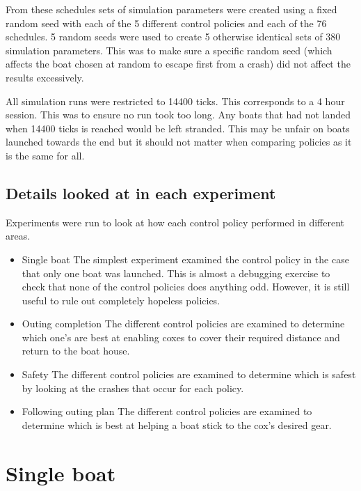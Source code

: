   From these schedules sets of simulation parameters were created
  using a fixed random seed with each of the 5 different control
  policies and each of the 76 schedules. 5 random seeds were used to
  create 5 otherwise identical sets of 380 simulation parameters. This
  was to make sure a specific random seed (which affects the boat
  chosen at random to escape first from a crash) did not affect the
  results excessively.

  All simulation runs were restricted to 14400 ticks. This corresponds
  to a 4 hour session. This was to ensure no run took too long. Any
  boats that had not landed when 14400 ticks is reached would be left
  stranded. This may be unfair on boats launched towards the end but
  it should not matter when comparing policies as it is the same for all.
  
  \subsection{Details looked at in each experiment}
  Experiments were run to look at how each control policy performed in
  different areas.
  \begin{itemize}
    \item{Single boat}
    The simplest experiment examined the control policy in the case
    that only one boat was launched. This is almost a debugging
    exercise to check that none of the control policies does anything
    odd. However, it is still useful to rule out completely hopeless policies.
  
    \item{Outing completion}
    The different control policies are examined to determine which
    one's are best at enabling coxes to cover their required distance
    and return to the boat house.
    
    \item{Safety}
    The different control policies are examined to determine which is
    safest by looking at the crashes that occur for each policy.

    \item{Following outing plan}
    The different control policies are examined to determine which is
    best at helping a boat stick to the cox's desired gear.
  \end{itemize}

\section{Single boat}
